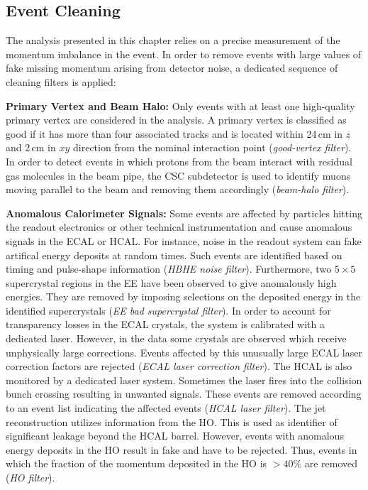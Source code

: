 \subsection{Event Cleaning}
\label{subsec:RA2_cleaning}
The analysis presented in this chapter relies on a precise measurement of the momentum imbalance in the event. In order to remove events with large values of fake missing momentum arising from detector noise, a dedicated sequence of cleaning filters is applied: 
\begin{description}
 \item{\textbf{Primary Vertex and Beam Halo:}} Only events with at least one high-quality primary vertex are considered in the analysis. A primary vertex is classified as good if it has more than four associated tracks and is located within 24\,cm in $z$ and 2\,cm in $xy$ direction from the nominal interaction point (\textit{good-vertex filter}). In order to detect events in which protons from the beam interact with residual gas molecules in the beam pipe, the CSC subdetector is used to identify muons moving parallel to the beam and removing them accordingly (\textit{beam-halo filter}).
 \item{\textbf{Anomalous Calorimeter Signals:}} Some events are affected by particles hitting the readout electronics or other technical instrumentation and cause anomalous signals in the ECAL or HCAL. For instance, noise in the readout system can fake artifical energy deposits at random times. Such events are identified based on timing and pulse-shape information (\textit{HBHE noise filter}). Furthermore, two $5 \times 5 $ supercrystal regions in the EE have been observed to give anomalously high energies. They are removed by imposing selections on the deposited energy in the identified supercrystals (\textit{EE bad supercrystal filter}). In order to account for transparency losses in the ECAL crystals, the system is calibrated with a dedicated laser. However, in the data some crystals are observed which receive unphysically large corrections. Events affected by this unusually large ECAL laser correction factors are rejected (\textit{ECAL laser correction filter}). The HCAL is also monitored by a dedicated laser system. Sometimes the laser fires into the collision bunch crossing resulting in unwanted signals. These events are removed according to an event list indicating the affected events (\textit{HCAL laser filter}). The jet reconstruction utilizes information from the HO. This is used as identifier of significant leakage beyond the HCAL barrel. However, events with anomalous energy deposits in the HO result in fake \MHT and have to be rejected. Thus, events in which the fraction of the momentum deposited in the HO is $> 40\%$ are removed (\textit{HO filter}).

\end{description}
